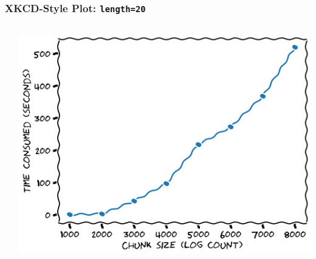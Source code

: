 \documentclass[xcolor={svgnames}]{beamer}
\newcommand{\pyfile}[2][]{}
\begin{document}
\begin{frame}[t,fragile]
    \frametitle{XKCD-Style Plot: \texttt{length=20}}
    \vspace{-2mm}
    \begin{columns}[T]
        \begin{column}{0.49\textwidth}
            \pyfile[style=footnotesize]{examples/xkcd-5.py}
        \end{column}
        \begin{column}{0.51\textwidth}
            \includegraphics[width=\textwidth]{img/xkcd-5.png}
        \end{column}
    \end{columns}
\end{frame}
\end{document}
